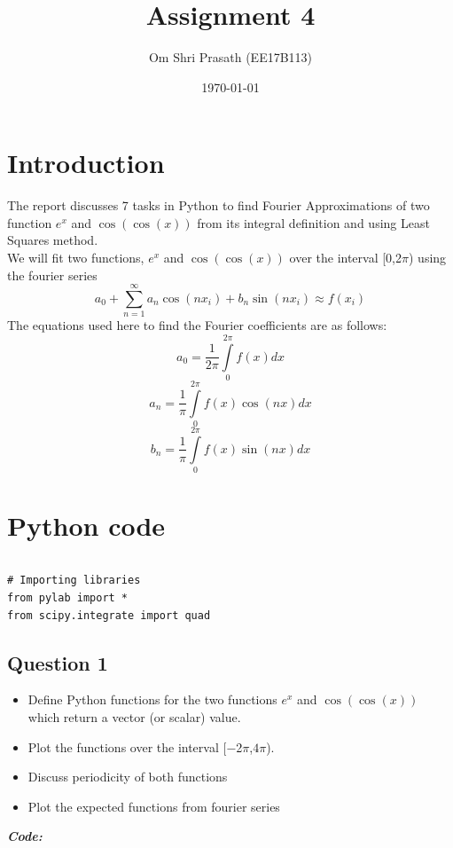 \documentclass[11pt, a4paper]{article}
\title{Assignment 4} %
\author{Om Shri Prasath (EE17B113)} %
\date{\today} %
\begin{document}
	
	
\maketitle %
	\section{Introduction}
	The report discusses 7 tasks in Python to find Fourier Approximations of two function $e^{x}$ and $\cos(\cos(x))$ from its integral definition and using Least Squares method.\\
	We will fit two functions, $e^{x}$ and $\cos(\cos(x))$ over the interval [0,2$\pi$) using the fourier series
 	\begin{equation}
    a_{0} + \sum\limits_{n=1}^{\infty} {{a_{n}\cos(nx_{i})+b_{n}\sin(nx_{i})}} \approx f(x_{i}) 
    \end{equation}
    	The equations used here to find the Fourier coefficients are as follows:
    \begin{equation}
         a_{0} = \frac{1}{2\pi}\int\limits_{0}^{2\pi} f(x)dx 
    \end{equation}
    \begin{equation}
         a_{n} = \frac{1}{\pi}\int\limits_{0}^{2\pi} f(x)\cos(nx)dx 
    \end{equation}
    \begin{equation}
         b_{n} = \frac{1}{\pi}\int\limits_{0}^{2\pi} f(x)\sin(nx)dx 
    \end{equation}
     \section{Python code}
     
     \begin{lstlisting}

     \end{lstlisting}
     \begin{lstlisting}
# Importing libraries
from pylab import *
from scipy.integrate import quad
     \end{lstlisting}
     \break
     \subsection{Question 1}\label{question-1}

     \begin{itemize}
     \item
       Define Python functions for the two functions \(e^{x}\) and
       \(\cos(\cos(x))\) which return a vector (or scalar) value.\\
     \item
       Plot the functions over the interval {[}−2\(\pi\),\(4\pi\)).
     \item
       Discuss periodicity of both functions
     \item
       Plot the expected functions from fourier series
     \end{itemize}
     \textit{\textbf{Code:}}
\end{document}
